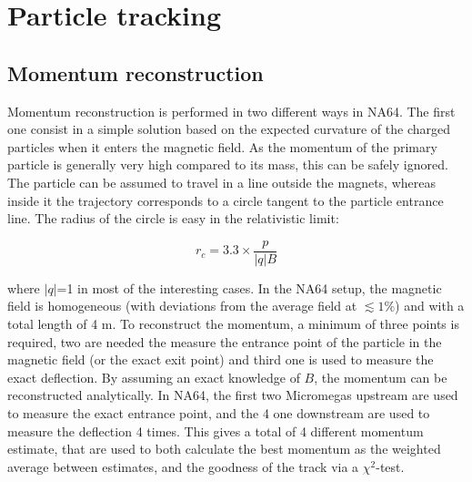 
\newcommand{\appdird}{appendices/plots/appendixD}

\chapter{Particle tracking} %

\label{AppendixD} %



\section{Momentum reconstruction}
\label{appD:sec:mom-reco}

Momentum reconstruction is performed in two different ways in NA64. The first one consist in a simple solution based on the expected curvature of the charged particles when it enters the magnetic field. As the momentum of the primary particle is generally very high compared to its mass, this can be safely ignored. The particle can be assumed to travel in a line outside the magnets, whereas inside it the trajectory corresponds to a circle tangent to the particle entrance line. The radius of the circle is easy in the relativistic limit:

\begin{equation}
  \label{eq:gyro-radius}
  r_c = 3.3 \times \frac{p}{\left|q\right|B}
\end{equation}

where $\left|q\right|$=1 in most of the interesting cases. In the NA64 setup, the magnetic field is homogeneous (with deviations from the average field at $\lesssim 1\%$) and with a total length of 4 \si{\meter}. To reconstruct the momentum, a minimum of three points is required, two are needed the measure the entrance point of the particle in the magnetic field (or the exact exit point) and third one is used to measure the exact deflection. By assuming an exact knowledge of $B$, the momentum can be reconstructed analytically. In NA64, the first two Micromegas upstream are used to measure the exact entrance point, and the 4 one downstream are used to measure the deflection 4 times. This gives a total of 4 different momentum estimate, that are used to both calculate the best momentum as the weighted average between estimates, and the goodness of the track via a $\chi^2$-test.

